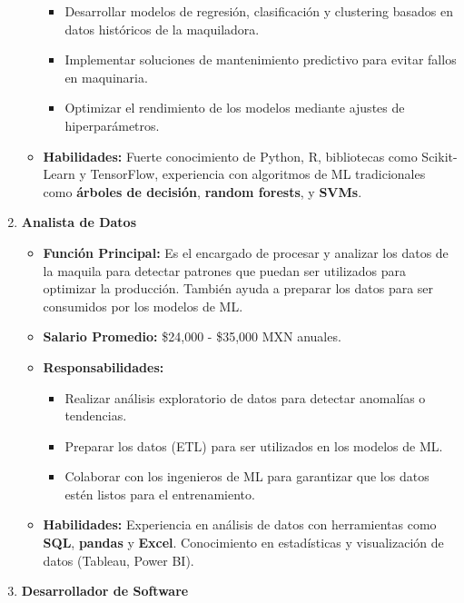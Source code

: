 \documentclass[
  10pt,
  letterpaper,
]{book}
\providecommand{\tightlist}{%
  \setlength{\itemsep}{0pt}\setlength{\parskip}{0pt}}\usepackage{longtable,booktabs,array}
\begin{document}
\begin{enumerate}
\begin{itemize}
    \begin{itemize}
    \tightlist
    \item
      Desarrollar modelos de regresión, clasificación y clustering
      basados en datos históricos de la maquiladora.
    \item
      Implementar soluciones de mantenimiento predictivo para evitar
      fallos en maquinaria.
    \item
      Optimizar el rendimiento de los modelos mediante ajustes de
      hiperparámetros.
    \end{itemize}
  \item
    \textbf{Habilidades:} Fuerte conocimiento de Python, R, bibliotecas
    como Scikit-Learn y TensorFlow, experiencia con algoritmos de ML
    tradicionales como \textbf{árboles de decisión}, \textbf{random
    forests}, y \textbf{SVMs}.
  \end{itemize}
\item
  \textbf{Analista de Datos}

  \begin{itemize}
  \tightlist
  \item
    \textbf{Función Principal:} Es el encargado de procesar y analizar
    los datos de la maquila para detectar patrones que puedan ser
    utilizados para optimizar la producción. También ayuda a preparar
    los datos para ser consumidos por los modelos de ML.
  \item
    \textbf{Salario Promedio:} \$24,000 - \$35,000 MXN anuales.
  \item
    \textbf{Responsabilidades:}

    \begin{itemize}
    \tightlist
    \item
      Realizar análisis exploratorio de datos para detectar anomalías o
      tendencias.
    \item
      Preparar los datos (ETL) para ser utilizados en los modelos de ML.
    \item
      Colaborar con los ingenieros de ML para garantizar que los datos
      estén listos para el entrenamiento.
    \end{itemize}
  \item
    \textbf{Habilidades:} Experiencia en análisis de datos con
    herramientas como \textbf{SQL}, \textbf{pandas} y \textbf{Excel}.
    Conocimiento en estadísticas y visualización de datos (Tableau,
    Power BI).
  \end{itemize}
\item
  \textbf{Desarrollador de Software}


\end{enumerate}
\end{document}
